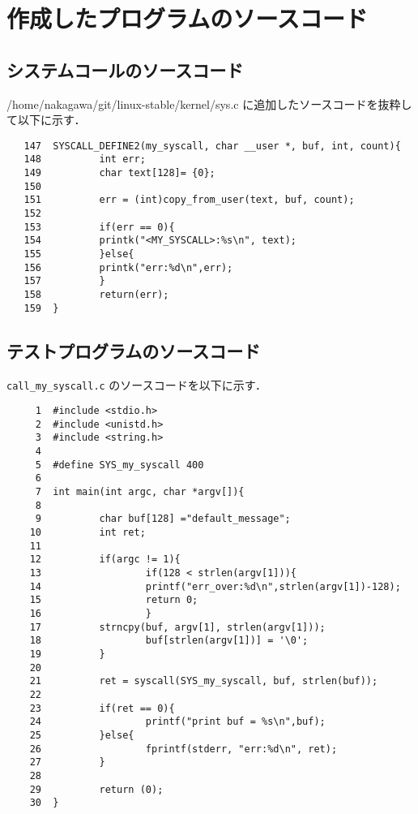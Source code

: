 \documentclass[12pt]{jsarticle}
\begin{document}
\section{作成したプログラムのソースコード}
\subsection{システムコールのソースコード}\label{sec:syscall}
 /home/nakagawa/git/linux-stable/kernel/sys.c に追加したソースコードを抜粋して以下に示す．
\begin{verbatim}
   147	SYSCALL_DEFINE2(my_syscall, char __user *, buf, int, count){
   148	        int err;
   149	        char text[128]= {0};
   150	
   151	        err = (int)copy_from_user(text, buf, count);
   152	
   153	        if(err == 0){
   154	        printk("<MY_SYSCALL>:%s\n", text);
   155	        }else{
   156	        printk("err:%d\n",err);
   157	        }
   158	        return(err);
   159	}
\end{verbatim}
\subsection{テストプログラムのソースコード}\label{sec:test}
\verb|call_my_syscall.c| のソースコードを以下に示す．
\begin{verbatim}
     1	#include <stdio.h>
     2	#include <unistd.h>
     3	#include <string.h>
     4	
     5	#define SYS_my_syscall 400
     6	
     7	int main(int argc, char *argv[]){
     8	
     9	        char buf[128] ="default_message";
    10	        int ret;
    11	
    12	        if(argc != 1){
    13	                if(128 < strlen(argv[1])){
    14	                printf("err_over:%d\n",strlen(argv[1])-128);
    15	                return 0;
    16	                }
    17	        strncpy(buf, argv[1], strlen(argv[1]));
    18                  buf[strlen(argv[1])] = '\0';
    19	        }
    20	
    21	        ret = syscall(SYS_my_syscall, buf, strlen(buf));
    22	
    23          if(ret == 0){
    24	                printf("print buf = %s\n",buf);
    25	        }else{
    26                  fprintf(stderr, "err:%d\n", ret);
    27	        }
    28	
    29          return (0);
    30	}
\end{verbatim}


\end{document}
